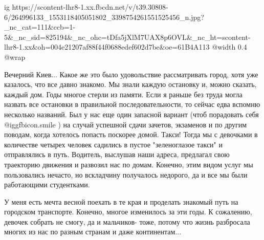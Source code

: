 \ifcmt
  ig https://scontent-lhr8-1.xx.fbcdn.net/v/t39.30808-6/264996133_1553118405051802_3398754261551525456_n.jpg?_nc_cat=111&ccb=1-5&_nc_sid=825194&_nc_ohc=tDfa5jXlM7UAX8p6OVL&_nc_ht=scontent-lhr8-1.xx&oh=004e21207af88f44f0688edef602d7be&oe=61B4A113
  @width 0.4
  @wrap 
\fi

Вечерний Киев... Какое же это было удовольствие рассматривать город, хотя уже
казалось, что все давно знакомо. Мы знали каждую остановку и, можно сказать,
каждый дом. Годы многое стерли из памяти. Если я раньше без труда могла назвать
все остановки в правильной последовательности, то сейчас едва вспомню несколько
названий. Был у нас еще один запасной вариант (чтоб порадовать себя @igg{fbicon.smile} ) на
случай успешной сдачи зачетов, экзаменов и по другим поводам, когда хотелось
попасть поскорее домой. Такси! Тогда мы с девочками в количестве четырех
человек садились в пустое "зеленоглазое такси" и отправлялись в путь. Водитель,
выслушав наши адреса, предлагал свою траекторию движения и развозил нас по
домам. Конечно, этим видом услуг мы пользовались нечасто, но вскладчину
получалось недорого, да и все мы были работающими студентками. 

У меня есть мечта весной поехать в те края и проделать знакомый путь на
городском транспорте. Конечно, многое изменилось за эти годы. К сожалению,
девочек собрать не смогу, да и мальчиков- тоже, потому что жизнь разбросала
многих из нас по разным странам и даже континентам...

